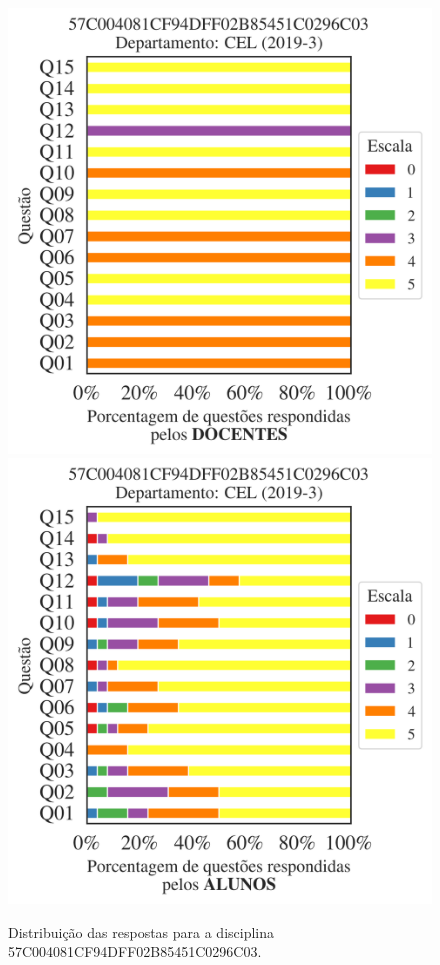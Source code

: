 \documentclass[a4paper,10pt]{article}
\begin{document}
\begin{figure}[h]
\centering
\includegraphics[width=0.485\linewidth]{analise_disciplina_departamento_CEL_57C004081CF94DFF02B85451C0296C03_docentes.png}
\includegraphics[width=0.485\linewidth]{analise_disciplina_departamento_CEL_57C004081CF94DFF02B85451C0296C03_alunos.png}
\caption{\label{fig:analise_geral_departamento}                Distribuição das respostas para a disciplina 57C004081CF94DFF02B85451C0296C03. }
\end{figure}
\end{document}
